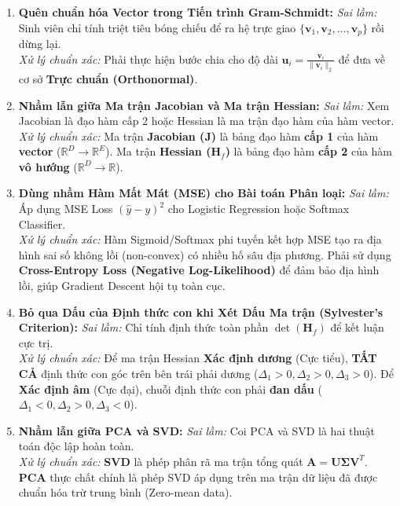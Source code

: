 \documentclass[11pt,a4paper]{article}
\begin{document}
\begin{bottleneckbox}
\begin{enumerate}
    \item \textbf{Quên chuẩn hóa Vector trong Tiến trình Gram-Schmidt:}
    \textit{Sai lầm:} Sinh viên chỉ tính triệt tiêu bóng chiếu để ra hệ trực giao $\{\mathbf{v}_1, \mathbf{v}_2, \dots, \mathbf{v}_p\}$ rồi dừng lại.\\
    \textit{Xử lý chuẩn xác:} Phải thực hiện bước chia cho độ dài $\mathbf{u}_i = \frac{\mathbf{v}_i}{\|\mathbf{v}_i\|_2}$ để đưa về cơ sở \textbf{Trực chuẩn (Orthonormal)}.
    
    \item \textbf{Nhầm lẫn giữa Ma trận Jacobian và Ma trận Hessian:}
    \textit{Sai lầm:} Xem Jacobian là đạo hàm cấp 2 hoặc Hessian là ma trận đạo hàm của hàm vector.\\
    \textit{Xử lý chuẩn xác:} Ma trận \textbf{Jacobian ($\mathbf{J}$)} là bảng đạo hàm \textbf{cấp 1} của hàm \textbf{vector} ($\mathbb{R}^D \rightarrow \mathbb{R}^E$). Ma trận \textbf{Hessian ($\mathbf{H}_f$)} là bảng đạo hàm \textbf{cấp 2} của hàm \textbf{vô hướng} ($\mathbb{R}^D \rightarrow \mathbb{R}$).
    
    \item \textbf{Dùng nhầm Hàm Mất Mát (MSE) cho Bài toán Phân loại:}
    \textit{Sai lầm:} Áp dụng MSE Loss $(\hat{y} - y)^2$ cho Logistic Regression hoặc Softmax Classifier.\\
    \textit{Xử lý chuẩn xác:} Hàm Sigmoid/Softmax phi tuyến kết hợp MSE tạo ra địa hình sai số không lồi (non-convex) có nhiều hố sâu địa phương. Phải sử dụng \textbf{Cross-Entropy Loss (Negative Log-Likelihood)} để đảm bảo địa hình lồi, giúp Gradient Descent hội tụ toàn cục.
    
    \item \textbf{Bỏ qua Dấu của Định thức con khi Xét Dấu Ma trận (Sylvester's Criterion):}
    \textit{Sai lầm:} Chỉ tính định thức toàn phần $\det(\mathbf{H}_f)$ để kết luận cực trị.\\
    \textit{Xử lý chuẩn xác:} Để ma trận Hessian \textbf{Xác định dương} (Cực tiểu), \textbf{TẤT CẢ} định thức con góc trên bên trái phải dương ($\Delta_1 > 0, \Delta_2 > 0, \Delta_3 > 0$). Để \textbf{Xác định âm} (Cực đại), chuỗi định thức con phải \textbf{đan dấu} ($\Delta_1 < 0, \Delta_2 > 0, \Delta_3 < 0$).
    
    \item \textbf{Nhầm lẫn giữa PCA và SVD:}
    \textit{Sai lầm:} Coi PCA và SVD là hai thuật toán độc lập hoàn toàn.\\
    \textit{Xử lý chuẩn xác:} \textbf{SVD} là phép phân rã ma trận tổng quát $\mathbf{A} = \mathbf{U} \mathbf{\Sigma} \mathbf{V}^T$. \textbf{PCA} thực chất chính là phép SVD áp dụng trên ma trận dữ liệu đã được chuẩn hóa trừ trung bình (Zero-mean data).
    

\end{enumerate}
\end{bottleneckbox}
\end{document}

